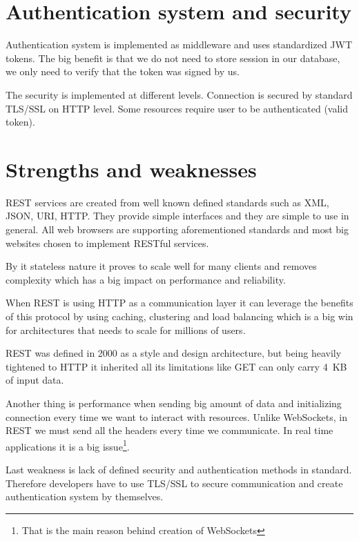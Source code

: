 \section{Authentication system and security}
Authentication system is implemented as middleware and uses standardized JWT
tokens\cite{JWT-rfc}. The big benefit is that we do not need to store session
in our database, we only need to verify that the token was signed by us.

The security is implemented at different levels. Connection is secured by
standard TLS/SSL on HTTP level. Some resources require user to be authenticated
(valid token).


\section{Strengths and weaknesses}
REST services are created from well known defined standards such as XML, JSON,
URI, HTTP\@. They provide simple interfaces and they are simple to use in
general. All web browsers are supporting aforementioned standards and most big
websites chosen to implement RESTful services.

By it stateless nature it proves to scale well for many clients and removes
complexity which has a big impact on performance and reliability.

When REST is using HTTP as a communication layer it can leverage the benefits
of this protocol by using caching, clustering and load balancing which is a big
win for architectures that needs to scale for millions of users.

REST was defined in 2000\cite{REST-wiki} as a style and design architecture,
but being heavily tightened to HTTP it inherited all its limitations like GET
can only carry 4~KB of input data\cite[p.~3]{restful-web-services}.

Another thing is performance when sending big amount of data and initializing
connection every time we want to interact with resources. Unlike WebSockets, in
REST we must send all the headers every time we communicate. In real time
applications it is a big issue\footnote{That is the main reason behind creation
of WebSockets}.

Last weakness is lack of defined security and authentication methods in
standard. Therefore developers have to use TLS/SSL to secure communication and
create authentication system by themselves.
